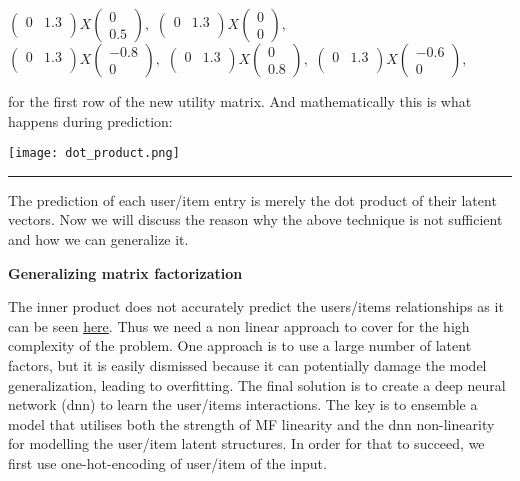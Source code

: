 \documentclass[]{article}
\begin{document}
\begin{center}
	$\left(\begin{array}{cc} 0 & 1.3\\\end{array}\right)  X  \left(\begin{array}{c} 0 \\ 0.5 \end{array}\right),$
	$\left(\begin{array}{cc} 0 & 1.3\\\end{array}\right)  X  \left(\begin{array}{c} 0 \\ 0 \end{array}\right),$
	\\ 
	$\left(\begin{array}{cc} 0 & 1.3\\\end{array}\right)  X  \left(\begin{array}{c} -0.8 \\ 0 \end{array}\right),$
	$\left(\begin{array}{cc} 0 & 1.3\\\end{array}\right)  X  \left(\begin{array}{c} 0 \\ 0.8 \end{array}\right),$
	$\left(\begin{array}{cc} 0 & 1.3\\\end{array}\right)  X  \left(\begin{array}{c} -0.6 \\ 0 \end{array}\right),$
	
	for the first row of the new utility matrix. And mathematically this is what happens during prediction:
	
	\texttt{[image: dot\_product.png]}
	\\
	\noindent
	{\color{Blue} \rule{\linewidth}{0.5mm}}
	The prediction of each user/item entry is merely the dot product of their latent vectors.
	Now we will discuss the reason why the above technique is not sufficient and how we can generalize it.
	
	\Large\textbf{Generalizing matrix factorization}
	
	The inner product does not accurately predict the users/items relationships as it can be seen \href{https://liqiangnie.github.io/paper/p173-he.pdf}{here}. Thus we need a non linear approach to cover for the high complexity of the problem. One approach is to use a large number of latent factors, but it is easily dismissed because it can potentially damage the model generalization, leading to overfitting. The final solution is to create a deep neural network (dnn) to learn the user/items interactions. The key is to ensemble a model that utilises both the strength of MF linearity and the dnn non-linearity for modelling the user/item latent structures. In order for that to succeed, we first use one-hot-encoding of user/item of the input.
	

\end{center}
\end{document}
